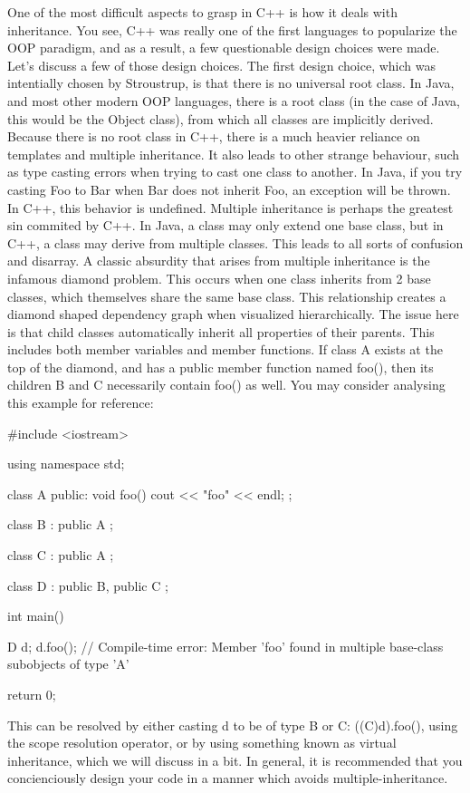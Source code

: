 \documentclass{article}
\begin{document}
One of the most difficult aspects to grasp in C++ is how it deals with inheritance. You see, C++ was really
one of the first languages to popularize the OOP paradigm, and as a result, a few questionable design choices
were made. Let's discuss a few of those design choices. The first design choice, which was intentially
chosen by Stroustrup, is that there is no universal root class. In Java, and most other modern OOP languages,
there is a root class (in the case of Java, this would be the Object class), from which all classes are
implicitly derived. Because there is no root class in C++, there is a much heavier reliance on templates and
multiple inheritance. It also leads to other strange behaviour, such as type casting errors when trying to cast
one class to another. In Java, if you try casting Foo to Bar when Bar does not inherit Foo, an exception will
be thrown. In C++, this behavior is undefined. Multiple inheritance is perhaps the greatest sin commited by
C++. In Java, a class may only extend one base class, but in C++, a class may derive from multiple classes.
This leads to all sorts of confusion and disarray. A classic absurdity that arises from multiple inheritance
is the infamous diamond problem. This occurs when one class inherits from 2 base classes, which themselves
share the same base class. This relationship creates a diamond shaped dependency graph when visualized
hierarchically. The issue here is that child classes automatically inherit all properties of their parents.
This includes both member variables and member functions. If class A exists at the top of the diamond, and has
a public member function named foo(), then its children B and C necessarily contain foo() as well. You may
consider analysing this example for reference:

\begin{cpplst}
#include <iostream>

using namespace std;

class A
{
public:
    void foo()
    {
        cout << "foo" << endl;
    }
};

class B : public A
{};

class C : public A
{};

class D : public B, public C
{};

int main()
{
    D d;
    d.foo(); // Compile-time error: Member 'foo' found in multiple base-class subobjects of type 'A'

    return 0;
}
\end{cpplst}

This can be resolved by either casting d to be of type B or C: ((C)d).foo(), using the scope resolution
operator, or by using something known as virtual inheritance, which we will discuss in a bit. In general, it
is recommended that you concienciously design your code in a manner which avoids multiple-inheritance.
\end{document}
